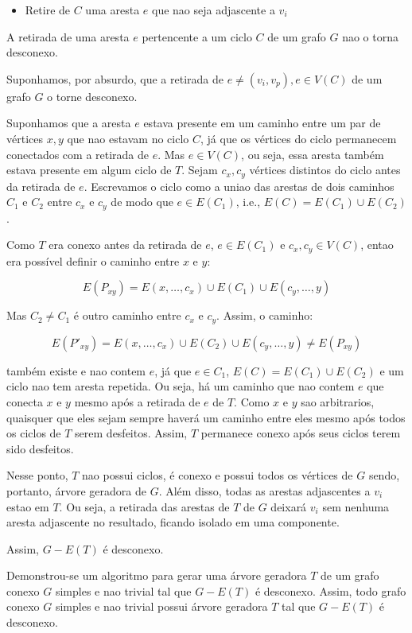 \documentclass{article}
\begin{document}
\begin{itemize}
	\item Retire de $C$ uma aresta $e$ que nao seja adjascente a $v_i$
\end{itemize}


A retirada de uma aresta $e$ pertencente a um ciclo $C$ de um grafo $G$ nao o torna desconexo. 

Suponhamos, por absurdo, que a retirada de $e  \neq (v_i, v_p), e \in V(C)$ de um grafo $G$ o torne desconexo.


Suponhamos que a aresta $e$ estava presente em um caminho entre um par de vértices $x,y$ que nao estavam no ciclo $C$, já que os vértices do ciclo permanecem conectados com a retirada de $e$. Mas $e \in V(C)$, ou seja, essa aresta também estava presente em algum ciclo de $T$. Sejam $c_x, c_y$  vértices distintos do ciclo antes da retirada de $e$. Escrevamos o ciclo como a uniao das arestas de dois caminhos $C_1$ e $C_2$ entre $c_x$ e $c_y$ de modo que $e \in E(C_1)$, i.e., $E(C) = E(C_1) \cup E(C_2)$.  

Como $T$ era conexo antes da retirada de $e$, $e \in E(C_1)$ e $c_x, c_y \in V(C)$, entao era possível definir o caminho entre $x$ e $y$:

$$
E(P_{xy}) =  E(x, \ldots, c_x) \cup E(C_1) \cup E(c_y, \ldots, y)
$$

Mas $C_2 \neq C_1$ é outro caminho entre $c_x$ e $c_y$. Assim, o caminho:

 $$
E(P'_{xy}) = E(x, \ldots, c_x) \cup E(C_2) \cup E(c_y, \ldots, y) \neq E(P_{xy})
 $$ 
 
 também existe e nao contem $e$, já que $e \in C_1$,  $E(C) = E(C_1) \cup E(C_2)$ e um ciclo nao tem aresta repetida. Ou seja, há um caminho que nao contem $e$ que conecta $x$ e $y$ mesmo após a retirada de $e$ de $T$. Como $x$ e $y$ sao arbitrarios, quaisquer que eles sejam sempre haverá um caminho entre eles mesmo após todos os ciclos de $T$ serem desfeitos. Assim, $T$ permanece conexo após seus ciclos terem sido desfeitos.
 
 Nesse ponto, $T$ nao possui ciclos, é conexo e possui todos os vértices de $G$ sendo, portanto,  árvore geradora de $G$. Além disso, todas as arestas adjascentes a $v_i$ estao em $T$. Ou seja, a retirada das arestas de $T$ de $G$ deixará $v_i$ sem nenhuma aresta adjascente no resultado, ficando isolado em uma componente.
 
 Assim, $G - E(T)$ é desconexo.
 
 Demonstrou-se um algoritmo para gerar uma árvore geradora $T$ de um grafo conexo $G$ simples e nao trivial tal que $G - E(T)$ é desconexo. Assim, todo grafo conexo $G$ simples e nao trivial possui árvore geradora $T$ tal que $G - E(T)$ é desconexo.
 
\end{document}
